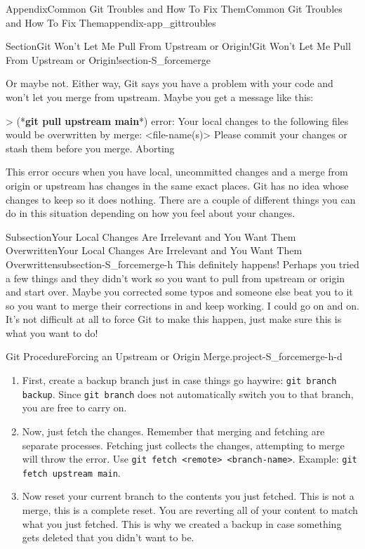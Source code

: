 \documentclass[twoside,10pt,]{book}
\newcommand{\mono}[1]{\texttt{#1}}
\newcommand{\consoleinput}[1]{\textbf{#1}}
\begin{document}
\begin{appendixptx}{Appendix}{Common Git Troubles and How To Fix Them}{}{Common Git Troubles and How To Fix Them}{}{}{appendix-app_gittroubles}
\begin{sectionptx}{Section}{Git Won't Let Me Pull From Upstream or Origin!}{}{Git Won't Let Me Pull From Upstream or Origin!}{}{}{section-S_forcemerge}
\begin{introduction}{}
\par
Or maybe not. Either way, Git says you have a problem with your code and won't let you merge from upstream. Maybe you get a message like this:%
\begin{console}{0}{1}{0}
> (*\consoleinput{git pull upstream main}*)
error: Your local changes to the following files would be overwritten by merge:
        <file-name(s)>
Please commit your changes or stash them before you merge.
Aborting
\end{console}
This error occurs when you have local, uncommitted changes and a merge from origin or upstream has changes in the same exact places. Git has no idea whose changes to keep so it does nothing. There are a couple of different things you can do in this situation depending on how you feel about your changes.%
\end{introduction}%
%
%
\typeout{************************************************}
\typeout{************************************************}
%
\begin{subsectionptx}{Subsection}{Your Local Changes Are Irrelevant and You Want Them Overwritten}{}{Your Local Changes Are Irrelevant and You Want Them Overwritten}{}{}{subsection-S_forcemerge-h}
%
This definitely happens! Perhaps you tried a few things and they didn't work so you want to pull from upstream or origin and start over. Maybe you corrected some typos and someone else beat you to it so you want to merge their corrections in and keep working. I could go on and on. It's not difficult at all to force Git to make this happen, just make sure this is what you want to do!%
\begin{project}{Git Procedure}{Forcing an Upstream or Origin Merge.}{project-S_forcemerge-h-d}%
\begin{enumerate}[font=\bfseries,label=(\alph*),ref=\alph*]%
\item{}First, create a backup branch just in case things go haywire: \mono{git branch backup}. Since \mono{git branch} does not automatically switch you to that branch, you are free to carry on.%
\item{}Now, just fetch the changes. Remember that merging and fetching are separate processes. Fetching just collects the changes, attempting to merge will throw the error. Use \mono{git fetch <remote> <branch-name>}. Example: \mono{git fetch upstream main}.%
\item{}Now reset your current branch to the contents you just fetched. This is not a merge, this is a complete reset. You are reverting all of your content to match what you just fetched. This is why we created a backup in case something gets deleted that you didn't want to be.%

\end{enumerate}
\end{project}
\end{subsectionptx}
\end{sectionptx}
\end{appendixptx}
\end{document}
